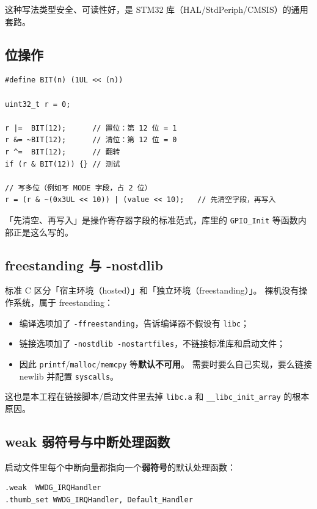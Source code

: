这种写法类型安全、可读性好，是 STM32 库（HAL/StdPeriph/CMSIS）的通用套路。

\subsection{位操作}

\begin{lstlisting}[style=code]
#define BIT(n) (1UL << (n))

uint32_t r = 0;

r |=  BIT(12);      // 置位：第 12 位 = 1
r &= ~BIT(12);      // 清位：第 12 位 = 0
r ^=  BIT(12);      // 翻转
if (r & BIT(12)) {} // 测试

// 写多位（例如写 MODE 字段，占 2 位）
r = (r & ~(0x3UL << 10)) | (value << 10);   // 先清空字段，再写入
\end{lstlisting}

「先清空、再写入」是操作寄存器字段的标准范式，库里的
\texttt{GPIO\_Init} 等函数内部正是这么写的。

\subsection{freestanding 与 -nostdlib}

标准 C 区分「宿主环境（hosted）」和「独立环境（freestanding）」。
裸机没有操作系统，属于 freestanding：

\begin{itemize}
  \item 编译选项加了 \texttt{-ffreestanding}，告诉编译器不假设有 \texttt{libc}；
  \item 链接选项加了 \texttt{-nostdlib -nostartfiles}，不链接标准库和启动文件；
  \item 因此 \texttt{printf}/\texttt{malloc}/\texttt{memcpy} 等\textbf{默认不可用}。
        需要时要么自己实现，要么链接 newlib 并配置 \texttt{syscalls}。
\end{itemize}

这也是本工程在链接脚本/启动文件里去掉 \texttt{libc.a} 和
\texttt{\_\_libc\_init\_array} 的根本原因。

\subsection{weak 弱符号与中断处理函数}

启动文件里每个中断向量都指向一个\textbf{弱符号}的默认处理函数：

\begin{lstlisting}[style=generic]
.weak  WWDG_IRQHandler
.thumb_set WWDG_IRQHandler, Default_Handler
\end{lstlisting}

